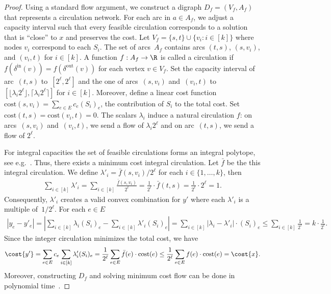 \begin{proof}
    Using a standard flow argument,
    we construct a digraph $D_f = (V_f, A_f)$ that represents a circulation network. For each arc in $a \in A_f$, we adjust a capacity interval such that every feasible circulation corresponds to a solution that is ``close'' to $x$ and preserves the cost. Let $V_f =\{ s, t \} \cup \{ v_i : i\in [k]\}$ where nodes $v_i$ correspond to each $S_i$. The set of arcs~$A_f$ contains arcs $(t, s)$, $(s,v_i)$, and $(v_i,t)$ for $i \in [k]$. A function $f: A_f \rightarrow \R$ is called a circulation if $f(\delta^{\mathrm{in}}(v)) = f(\delta^{\mathrm{out}}(v))$ for each vertex $v \in V_f$. 
    Set the capacity interval of arc~$(t,s)$ to~$[2^\ell, 2^\ell]$ and
    the one of arcs~$(s,v_i)$ and~$(v_i, t)$ to $[\lfloor \lambda_i 2^\ell \rfloor, \lceil \lambda_i 2^\ell \rceil]$ for $i \in [k]$. 
    Moreover, define a linear cost function $\mathrm{cost}(s,v_i) = \sum_{e \in E} c_e (S_i)_e$, the contribution of $S_i$ to the total cost.
    Set $\mathrm{cost}(t,s) = \mathrm{cost}(v_i, t) = 0$.
    The scalars $\lambda_i$ induce a natural circulation $f$: on 
    arcs~$(s, v_i)$ and~$(v_i, t)$, we send a flow of $\lambda_i 2^\ell$
    and on arc~$(t, s)$, we send a flow of $2^\ell$.
    
    For integral capacities the set of feasible circulations forms an integral polytope, see e.g.~\cite[Corollary 13.10b]{schrijver2003combinatorial}.
    Thus, there exists a minimum cost integral circulation. Let $\bar{f}$ be the this integral circulation. We define $\lambda'_i = \bar{f}(s, v_i) / 2^\ell$ for each $i\in\{1,\dotsc,k\}$, then
    \begin{align*}
    \sum_{i \in [k]} \lambda'_i = \sum_{i \in [k]} \frac{ \bar{f}(s,v_i)}{2^\ell} = \frac{1}{2^\ell} \cdot \bar{f}(t, s) = \frac{1}{2^\ell} \cdot 2^\ell  = 1.
    \end{align*}
    Consequently, $\lambda'_i$ creates a valid convex combination for $y'$ where each $\lambda'_i$ is a multiple of~$1/2^\ell$. For each $e \in E$
    \begin{align*}
    |y_e - y'_e| =  \left| \sum_{i \in [k]} \lambda_i (S_i)_e - \sum_{i \in [k]} \lambda'_i (S_i)_e \right| =  \sum_{i \in [k]} |\lambda_i - \lambda'_i| \cdot (S_i)_e \leq \sum_{i \in [k]} \frac{1}{2^\ell} = k \cdot \frac{1}{2^\ell}.
    \end{align*}
    Since the integer circulation minimizes the total cost, we have
    \begin{equation}
        \label{eq:psr-total-rounded-cost}
        \cost{y'} = \sum_{e\in E} c_e \sum_{i \in [k]} \lambda'_i (S_i)_e = \frac{1}{2^\ell} \sum_{e \in E} \bar{f}(e) \cdot \mathrm{cost}(e)
        \le \frac{1}{2^\ell} \sum_{e \in E} f(e) \cdot \mathrm{cost}(e)
        = \cost{x}.
    \end{equation}
    Moreover, constructing $D_f$ and solving minimum cost flow can be done in polynomial time~\cite{schrijver2003combinatorial}.
\end{proof}


